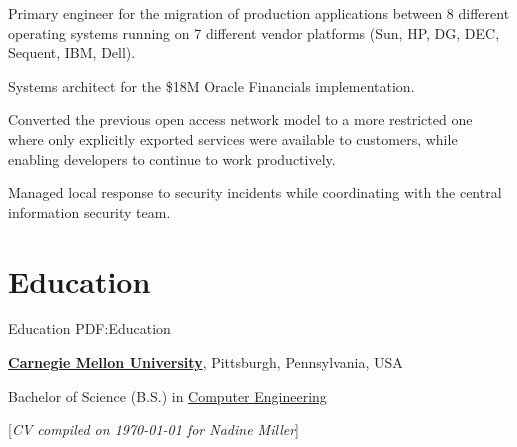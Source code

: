 \documentclass[letterpaper,10pt,oneside]{article}
\newcommand{\CVNote}{CV compiled on {\today} for Nadine Miller}
\begin{document}
\begin{body}
\begin{detail}
\BulletItem Primary engineer for the migration of production applications
between 8 different operating systems running on 7 different vendor
platforms (Sun, HP, DG, DEC, Sequent, IBM, Dell).

\BulletItem Systems architect for the \$18M Oracle Financials
implementation.

\BulletItem Converted the previous open access network model to a more
restricted one where only explicitly exported services were available to
customers, while enabling developers to continue to work productively.

\BulletItem Managed local response to security incidents while coordinating
with the central information security team.

\end{detail}
\EntryGap



\section
{Education}
{Education}
{PDF:Education}

\href{http://www.cmu.edu/}
{\textbf{Carnegie Mellon University}},
Pittsburgh, Pennsylvania, USA
\par
Bachelor of Science (B.S.) in
\href{http://www.ece.cmu.edu/}
{Computer Engineering}
\hfill




\end{body}


\begin{flushright}
\scriptsize%
[\textit{\CVNote}]%
\hspace{2.0mm}\null
\end{flushright}

\label{LastPage}~
\end{document}
